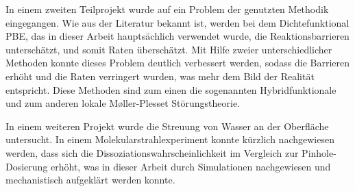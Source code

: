 \documentclass[11pt,DIV=13,a4paper,headinclude,german]{scrartcl}
\begin{document}
In einem zweiten Teilprojekt wurde auf ein Problem der genutzten Methodik eingegangen.
Wie aus der Literatur bekannt ist, werden bei dem Dichtefunktional PBE, das in dieser Arbeit hauptsächlich verwendet wurde, die Reaktionsbarrieren unterschätzt, und somit Raten überschätzt.
Mit Hilfe zweier unterschiedlicher Methoden konnte dieses Problem deutlich verbessert werden, sodass die Barrieren erhöht und die Raten verringert wurden, was mehr dem Bild der Realität entspricht.
Diese Methoden sind zum einen die sogenannten Hybridfunktionale und zum anderen lokale M\o{}ller-Plesset Störungstheorie.

In einem weiteren Projekt wurde die Streuung von Wasser an der Oberfläche untersucht.
In einem Molekularstrahlexperiment konnte kürzlich nachgewiesen werden, dass sich die Dissoziationswahrscheinlichkeit im Vergleich zur Pinhole-Dosierung erhöht, was in dieser Arbeit durch Simulationen nachgewiesen und mechanistisch aufgeklärt werden konnte.
\end{document}
